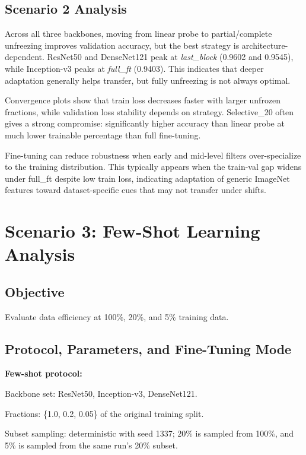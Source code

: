\documentclass[11pt,a4paper]{report}
\renewenvironment{leftbar}[1][\hsize]
  {\def\FrameCommand{{\color{subsectionblue}\vrule width 3pt}\hspace{0pt}}%
   \MakeFramed{\hsize#1\advance\hsize-\width\FrameRestore}}
  {\endMakeFramed}
\renewenvironment{itemize}{\begin{leftbar}\begin{originalitemize}}{\end{originalitemize}\end{leftbar}}
\begin{document}
\section{Scenario 2 Analysis}
Across all three backbones, moving from linear probe to partial/complete unfreezing improves validation accuracy, but the best strategy is architecture-dependent. ResNet50 and DenseNet121 peak at \textit{last\_block} (0.9602 and 0.9545), while Inception-v3 peaks at \textit{full\_ft} (0.9403). This indicates that deeper adaptation generally helps transfer, but fully unfreezing is not always optimal.

Convergence plots show that train loss decreases faster with larger unfrozen fractions, while validation loss stability depends on strategy. Selective\_20 often gives a strong compromise: significantly higher accuracy than linear probe at much lower trainable percentage than full fine-tuning.

Fine-tuning can reduce robustness when early and mid-level filters over-specialize to the training distribution. This typically appears when the train-val gap widens under full\_ft despite low train loss, indicating adaptation of generic ImageNet features toward dataset-specific cues that may not transfer under shifts.

\chapter{Scenario 3: Few-Shot Learning Analysis}

\section{Objective}
Evaluate data efficiency at 100\%, 20\%, and 5\% training data.

\section{Protocol, Parameters, and Fine-Tuning Mode}
\textbf{Few-shot protocol:}
\begin{itemize}
  \item Backbone set: ResNet50, Inception-v3, DenseNet121.
  \item Fractions: \{1.0, 0.2, 0.05\} of the original training split.
  \item Subset sampling: deterministic with seed 1337; 20\% is sampled from 100\%, and 5\% is sampled from the same run's 20\% subset.
\end{itemize}
\end{document}
